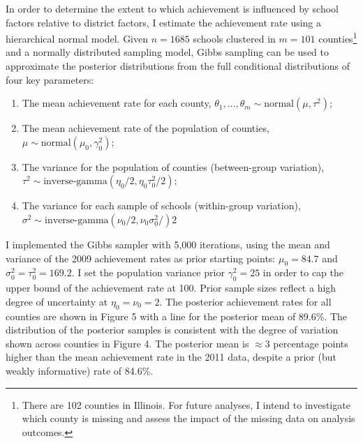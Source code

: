 \documentclass[11pt]{article}
\begin{document}
In order to determine the extent to which achievement is influenced by school factors relative to district factors, I estimate the achievement rate using a hierarchical normal model.  Given $n=1685$ schools clustered in $m=101$ counties\footnote{There are 102 counties in Illinois.  For future analyses, I intend to investigate which county is missing and assess the impact of the missing data on analysis outcomes.} and a normally distributed sampling model, Gibbs sampling can be used to approximate the posterior distributions from the full conditional distributions of four key parameters: 
\begin{enumerate}
\item The mean achievement rate for each county, $\theta_1,...,\theta_m\sim \text{normal}(\mu,\tau^2)$;
\item The mean achievement rate of the population of counties, $\mu\sim\text{normal}(\mu_0,\gamma_0^2)$;
\item The variance for the population of counties (between-group variation), \\$\tau^2\sim\text{inverse-gamma}(\eta_0/2,\eta_0\tau_0^2/2)$;
\item The variance for each sample of schools (within-group variation), \\$\sigma^2\sim\text{inverse-gamma}(\nu_0/2,\nu_0\sigma_0^2/)2$ 
\end{enumerate}

I implemented the Gibbs sampler with 5,000 iterations, using the mean and variance of the 2009 achievement rates as prior starting points: $\mu_0=84.7$ and $\sigma_0^2=\tau_0^2=169.2$.  I set the population variance prior $\gamma_0^2=25$ in order to cap the upper bound of the achievement rate at 100.  Prior sample sizes reflect a high degree of uncertainty at $\eta_0=\nu_0=2$.  The posterior achievement rates for all counties are shown in Figure 5 with a line for the posterior mean of 89.6\%.  The distribution of the posterior samples is consistent with the degree of variation shown across counties in Figure 4.  The posterior mean is $\approx 3$ percentage points higher than the mean achievement rate in the 2011 data, despite a prior (but weakly informative) rate of 84.6\%.
\end{document}
